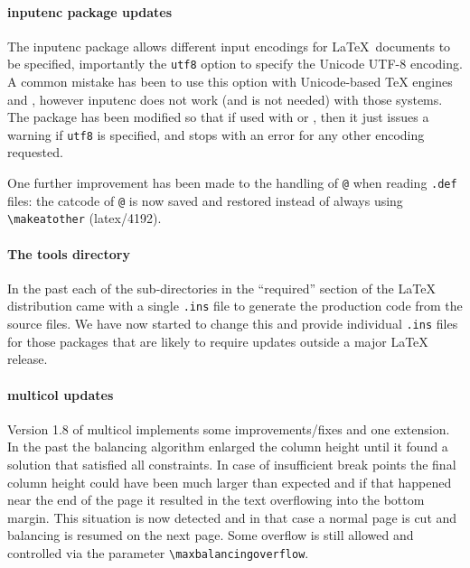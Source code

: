 \documentclass{ltnews}
\begin{document}
\paragraph{\textsf{inputenc} package updates}

The \textsf{inputenc} package allows different input encodings for
\LaTeX\ documents to be specified, importantly the \texttt{utf8}
option to specify the Unicode UTF-8 encoding. A common mistake has been
to use this option with Unicode-based TeX engines  and ,
however \textsf{inputenc} does not work (and is not needed) with those
systems. The package has been modified so that if used with  
or , then it just issues a warning if \texttt{utf8} is
specified, and stops with an error for any other encoding requested.

One further improvement has been made to the handling of \texttt{@} when
  reading \texttt{.def} files: the  catcode of \texttt{@} is now saved
  and restored instead of always using \verb=\makeatother=  (latex/4192).



\paragraph{The tools directory}

In the past each of the sub-directories in the ``required'' section of
the \LaTeX{} distribution came with a single \texttt{.ins} file to
generate the production code from the source files. We have now
started to change this and provide individual \texttt{.ins} files for
those packages that are likely to require updates outside a major
\LaTeX{} release.

\paragraph{\textsf{multicol} updates}

Version 1.8 of \textsf{multicol} implements some
improvements/fixes and one extension. In the past the balancing
algorithm enlarged the column height until it found a solution that
satisfied all constraints. In case of insufficient break points the
final column height could have been much larger than expected and if
that happened near the end of the page it resulted in the text
overflowing into the bottom margin. This situation is now detected and
in that case a normal page is cut and balancing is resumed on the next
page. Some overflow is still allowed and controlled via the parameter
\verb=\maxbalancingoverflow=.
\end{document}
